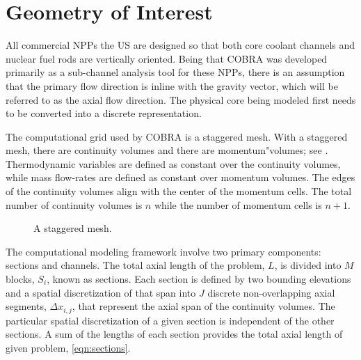 \section{Geometry of Interest}
\label{sect:topology}
All commercial NPPs the US are designed so that both core coolant channels and nuclear fuel rods are vertically oriented.
Being that COBRA was developed primarily as a sub-channel analysis tool for these NPPs, there is an assumption that the primary flow direction is inline with the gravity vector, which will be referred to as the axial flow direction.
The physical core being modeled first needs to be converted into a discrete representation. 

The computational grid used by COBRA is a staggered mesh.
With a staggered mesh, there are continuity volumes and there are momentum"volumes; see .
Thermodynamic variables are defined as constant over the continuity volumes, while mass flow-rates are defined as constant over momentum volumes.
The edges of the continuity volumes align with the center of the momentum cells.
The total number of continuity volumes is $n$ while the number of momentum cells is $n+1$. 

\begin{figure}[ht]
\caption{A staggered mesh.}
\label{fig:staggered_mesh}
\begin{center}
\end{center}
\end{figure}

The computational modeling framework involve two primary components: sections and channels.
The total axial length of the problem, $L$, is divided into $M$ blocks, $S_i$, known as sections.
Each section is defined by two bounding elevations and a spatial discretization of that span into $J$ discrete non-overlapping axial segments, $\Delta x_{i,j}$, that represent the axial span of the continuity volumes.
The particular spatial discretization of a given section is independent of the other sections.
A sum of the lengths of each section provides the total axial length of given problem, \eqref{eqn:sections}.

